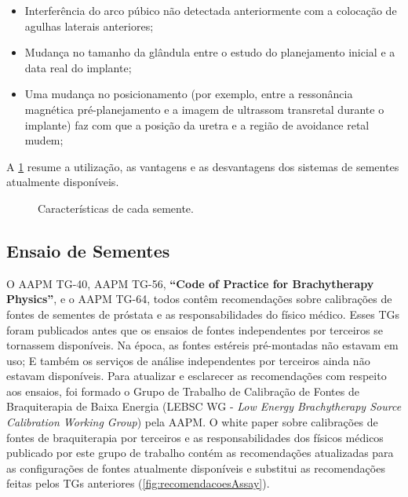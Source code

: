 \documentclass[11pt,a4paper]{article}
\newcounter{exemplo}
\begin{document}
	\begin{itemize}[label=\textcolor{CarnationPink}{$\blacktriangleright$}]
		\item Interferência do arco púbico não detectada anteriormente com a colocação de agulhas laterais anteriores;
		\item Mudança no tamanho da glândula entre o estudo do planejamento inicial e a data real do implante;
		\item Uma mudança no posicionamento (por exemplo, entre a ressonância magnética pré-planejamento e a imagem de ultrassom transretal  durante o implante) faz com que a posição da uretra e a região de avoidance retal mudem;
	\end{itemize}

	A \ref{fig:sistemasSementes} resume a utilização, as vantagens e as desvantagens dos sistemas de sementes atualmente disponíveis.

	\begin{figure}[h]
		\centering
		\caption{Características de cada semente.}
		\label{fig:sistemasSementes}
	\end{figure}

\subsection*{Ensaio de Sementes}  

	O AAPM TG-40, AAPM TG-56, \textbf{``Code of Practice for Brachytherapy Physics''}, e o AAPM TG-64, todos contêm recomendações sobre calibrações de fontes de sementes de próstata e as responsabilidades do físico médico. Esses TGs foram publicados antes que os ensaios de fontes independentes por terceiros se tornassem disponíveis. Na época, as fontes estéreis pré-montadas não estavam em uso; E também os serviços de análise independentes por terceiros ainda não estavam disponíveis. Para atualizar e esclarecer as recomendações com respeito aos ensaios, foi formado o Grupo de Trabalho de Calibração de Fontes de Braquiterapia de Baixa Energia (LEBSC WG -  \textit{Low Energy Brachytherapy Source Calibration Working Group}) pela AAPM. O white paper sobre calibrações de fontes de braquiterapia por terceiros e as responsabilidades dos físicos médicos publicado por este grupo de trabalho contém as recomendações atualizadas para as configurações de fontes atualmente disponíveis e substitui as recomendações feitas pelos TGs anteriores (\ref{fig:recomendacoesAssay}).
\end{document}
